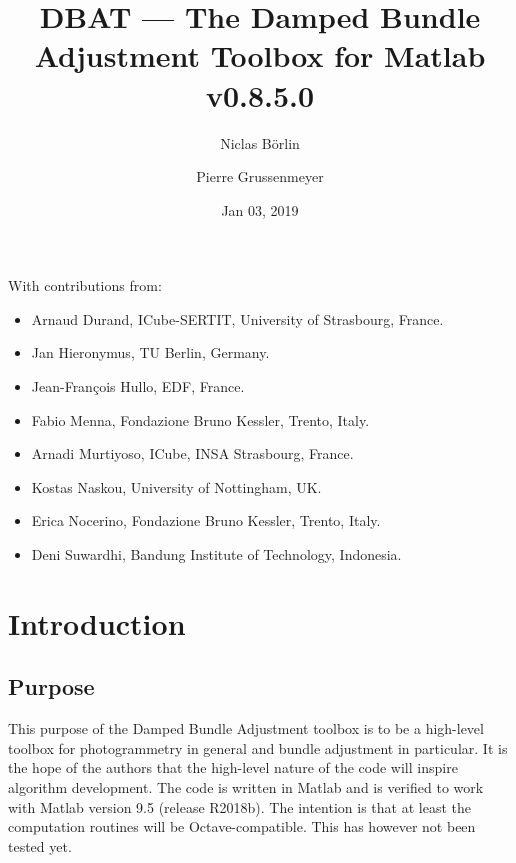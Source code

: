 \documentclass{article}
\begin{document}


\newcommand{\dbatversion}{0.8.5.0}
\newcommand{\dbatdate}{Jan 03, 2019}

\title{DBAT --- The Damped Bundle Adjustment Toolbox for Matlab\\\Large v\dbatversion{}}

\author[1]{Niclas B{\"o}rlin}
\author[2]{Pierre Grussenmeyer}
\date{\dbatdate}

\maketitle

\vfill
With contributions from:
\begin{itemize}
\item Arnaud Durand, ICube-SERTIT, University of Strasbourg, France.
\item Jan Hieronymus, TU Berlin, Germany.
\item Jean-Fran{\c{c}}ois Hullo, EDF, France.
\item Fabio Menna, Fondazione Bruno Kessler, Trento, Italy.
\item Arnadi Murtiyoso, ICube, INSA Strasbourg, France.
\item Kostas Naskou, University of Nottingham, UK.
\item Erica Nocerino, Fondazione Bruno Kessler, Trento, Italy.
\item Deni Suwardhi, Bandung Institute of Technology, Indonesia.
\end{itemize}
\newpage

\tableofcontents

\newpage

\section{Introduction}

\subsection{Purpose}

This purpose of the Damped Bundle Adjustment toolbox is to be a
high-level toolbox for photogrammetry in general and bundle adjustment
in particular. It is the hope of the authors that the high-level
nature of the code will inspire algorithm development. The code is
written in Matlab and is verified to work with Matlab version 9.5
(release R2018b). The intention is that at least the computation
routines will be Octave-compatible. This has however not been tested
yet.
\end{document}
